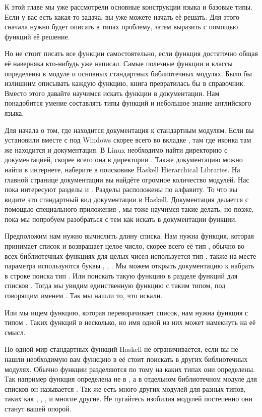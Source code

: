К этой главе мы уже рассмотрели основные конструкции языка
и базовые типы. Если у вас есть какая-то задача, вы уже можете
начать её решать. Для этого сначала нужно будет описать
в типах проблему, затем выразить с помощью функций её решение.

Но не стоит писать все функции самостоятельно, если функция
достаточно общая её наверняка кто-нибудь уже написал. 
Самые полезные функции и классы определены в модуле 
и основных стандартных библиотечных модулях. Было бы
излишним описывать каждую функцию, книга превратилась бы в
справочник. Вместо этого давайте научимся искать функции
в документации. Нам понадобится умение составлять типы
функций и небольшое знание английского языка. 

Для начала о том, где находится документация к стандартным модулям. 
Если вы установили  вместе с  под
Windows скорее всего во вкладке , там где иконка 
там же находится и документация. В Linux необходимо найти 
директорию с документацией, скорее всего она в директории
. Также документацию
можно найти в интернете, наберите в поисковике 
Haskell Hierarchical Libraries. На главной странице документации
вы найдёте огромное количество модулей. Нас пока интересуют
разделы  и . Разделы расположены по алфавиту.
То что вы видите это стандартный вид документации в Haskell. 
Документация делается с помощью специального приложения
, мы тоже научимся такие делать, но позже,
пока мы попробуем разобраться с тем как искать в документации
функции.  

Предположим нам нужно вычислить длину списка. Нам нужна
функция, которая принимает список и возвращает целое число,
скорее всего её тип , обычно во всех библиотечных
функциях для целых чисел используется тип , также на 
месте параметра используются буквы , , . 
Мы можем открыть документацию к  набрать в
строке поиска тип . Или поискать такую функцию
в разделе функций для списков . Тогда
мы увидим единственную функцию с таким типом, под говорящим 
именем . Так мы нашли то, что искали.

Или мы ищем функцию, которая переворачивает список, нам 
нужна функция с типом \In{[a] -> [a]}. Таких функций в 
несколько, но имя  одной из них может намекнуть
на её смысл. 

Но одной  мир стандартных функций Haskell 
не ограничивается, если вы не нашли необходимую вам функцию
в  её стоит поискать в других библиотечных модулях.
Обычно функции разделяются по тому на каких типах они определены.
Так например функция  определена
не в , а в отдельном библиотечном модуле для списков
он называется . Так же есть много других модулей
для разных типов, таких как , ,
,  и многие другие. Не пугайтесь
изобилия модулей постепенно они станут вашей опорой.


